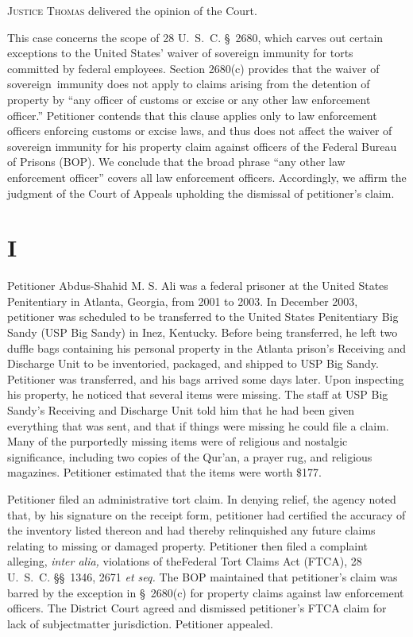 
\setcounter{page}{215}

  \textsc{Justice Thomas} delivered the opinion of the Court.

  This case concerns the scope of 28 U.~S.~C. \S~2680, which carves out certain exceptions to the United States' waiver of sovereign immunity for torts committed by federal employees. Section 2680(c) provides that the waiver of sovereign\starpage\ immunity does not apply to claims arising from the detention of property by ``any officer of customs or excise or any other law enforcement officer.'' Petitioner contends that this clause applies only to law enforcement officers enforcing customs or excise laws, and thus does not affect the waiver of sovereign immunity for his property claim against officers of the Federal Bureau of Prisons (BOP). We conclude that the broad phrase ``any other law enforcement officer'' covers all law enforcement officers. Accordingly, we affirm the judgment of the Court of Appeals upholding the dismissal of petitioner's claim. 
\section{I}

  Petitioner Abdus-Shahid M. S. Ali was a federal prisoner at the United States Penitentiary in Atlanta, Georgia, from 2001 to 2003. In December 2003, petitioner was scheduled to be transferred to the United States Penitentiary Big Sandy (USP Big Sandy) in Inez, Kentucky. Before being transferred, he left two duffle bags containing his personal property in the Atlanta prison's Receiving and Discharge Unit to be inventoried, packaged, and shipped to USP Big Sandy. Petitioner was transferred, and his bags arrived some days later. Upon inspecting his property, he noticed that several items were missing. The staff at USP Big Sandy's Receiving and Discharge Unit told him that he had been given everything that was sent, and that if things were missing he could file a claim. Many of the purportedly missing items were of religious and nostalgic significance, including two copies of the Qur'an, a prayer rug, and religious magazines. Petitioner estimated that the items were worth \$177.

  Petitioner filed an administrative tort claim. In denying relief, the agency noted that, by his signature on the receipt form, petitioner had certified the accuracy of the inventory listed thereon and had thereby relinquished any future claims relating to missing or damaged property. Petitioner then filed a complaint alleging, \emph{inter alia,} violations of the\starpage  Federal Tort Claims Act (FTCA), 28 U.~S.~C. \S\S~1346, 2671 \emph{et seq.} The BOP maintained that petitioner's claim was barred by the exception in \S~2680(c) for property claims against law enforcement officers. The District Court agreed and dismissed petitioner's FTCA claim for lack of subjectmatter jurisdiction. Petitioner appealed.

